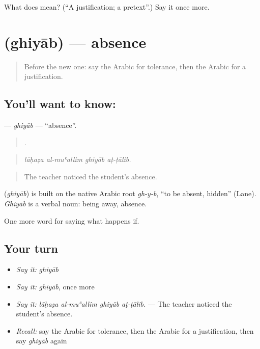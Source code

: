 \begin{tcolorbox}[breakable,colback=teal!4,colframe=teal!35!black,title={Before you move on}]
What does  mean? (\textquotedblleft{}A justification; a pretext\textquotedblright{}.) Say it once more.
\end{tcolorbox}
\section[\texorpdfstring{\ar{غياب} (ghiyāb)}{غياب (ghiyāb)}]{ (ghiyāb) — absence}

\label{lesson:AR-C422-ghiyab}



\begin{quote}
Before the new one: say the Arabic for tolerance, then the Arabic for a justification.
\end{quote}

\subsection*{You'll want to know: }
\textbf{} — \emph{ghiyāb} — \textquotedblleft{}absence\textquotedblright{}.

\begin{quote}
   .
\end{quote}

\begin{quote}
\emph{lāḥaẓa al-muʿallim ghiyāb aṭ-ṭālib.}
\end{quote}

\begin{quote}
The teacher noticed the student's absence.
\end{quote}

\begin{cousinweb}
\textbf{} (\emph{ghiyāb}) is built on the native Arabic root \emph{gh-y-b}, \textquotedblleft{}to be absent, hidden\textquotedblright{} (Lane). \emph{Ghiyāb} is a verbal noun: being away, absence.
\end{cousinweb}

\begin{grammarlens}[title={What you've built}]
One more word for saying what happens if.
\end{grammarlens}

\subsection*{Your turn}
\begin{itemize}
\raggedright
  \item \emph{Say it:} \emph{ghiyāb}
  \item \emph{Say it:} \emph{ghiyāb}, once more
  \item \emph{Say it:} \emph{lāḥaẓa al-muʿallim ghiyāb aṭ-ṭālib.} — The teacher noticed the student's absence.
  \item \emph{Recall:} say the Arabic for tolerance, then the Arabic for a justification, then say \emph{ghiyāb} again
\end{itemize}

